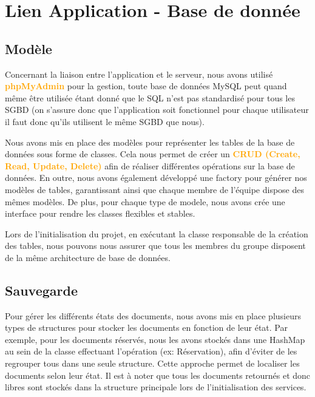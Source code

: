 \chapter*{Lien Application - Base de donnée}

\section{Modèle}

\bigskip

    Concernant la liaison entre l’application et le serveur, nous avons utilisé \textbf{\textcolor{orange}{phpMyAdmin}} pour la gestion,
    toute base de données MySQL peut quand même être utilisée étant donné que le SQL n’est pas standardisé pour tous
    les SGBD (on s’assure donc que l’application soit fonctionnel pour chaque utilisateur il faut donc qu’ils utilisent le même
    SGBD que nous).

\bigskip

    Nous avons mis en place des modèles pour représenter les tables de la base de données sous forme de classes.
    Cela nous permet de créer un \textbf{\textcolor{orange}{CRUD (Create, Read, Update, Delete)}} afin de réaliser différentes opérations sur la base de données.
    En outre, nous avons également développé une factory pour générer nos modèles de tables, garantissant ainsi que chaque
    membre de l’équipe dispose des mêmes modèles. De plus, pour chaque type de modele, nous avons crée une interface
    pour rendre les classes flexibles et stables.

\bigskip

    Lors de l’initialisation du projet, en exécutant la classe responsable de la création des tables,
    nous pouvons nous assurer que tous les membres du groupe disposent de la même architecture de base de données.

\section{Sauvegarde}

    Pour gérer les différents états des documents, nous avons mis en place plusieurs types de structures pour stocker
    les documents en fonction de leur état. Par exemple, pour les documents réservés, nous les avons stockés dans une
    HashMap au sein de la classe effectuant l'opération (ex: Réservation), afin d'éviter de les regrouper tous dans une seule structure.
    Cette approche permet de localiser les documents selon leur état.
    Il est à noter que tous les documents retournés et donc libres sont stockés dans la structure principale lors de
    l'initialisation des services.

